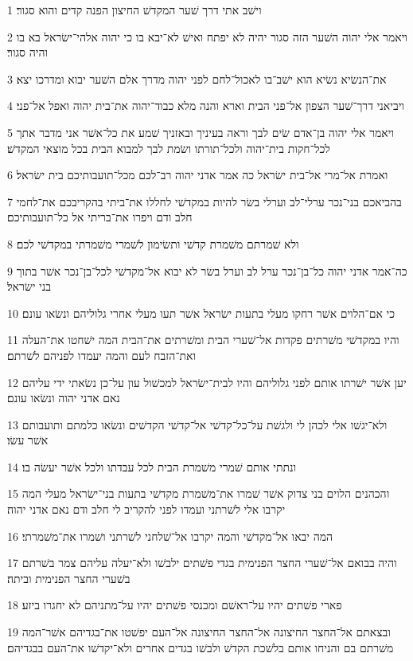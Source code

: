 \par 1 וישׁב אתי דרך שׁער המקדשׁ החיצון הפנה קדים והוא סגור׃
\par 2 ויאמר אלי יהוה השׁער הזה סגור יהיה לא יפתח ואישׁ לא־יבא בו כי יהוה אלהי־ישׂראל בא בו והיה סגור׃
\par 3 את־הנשׂיא נשׂיא הוא ישׁב־בו לאכול־לחם לפני יהוה מדרך אלם השׁער יבוא ומדרכו יצא׃
\par 4 ויביאני דרך־שׁער הצפון אל־פני הבית וארא והנה מלא כבוד־יהוה את־בית יהוה ואפל אל־פני׃
\par 5 ויאמר אלי יהוה בן־אדם שׂים לבך וראה בעיניך ובאזניך שׁמע את כל־אשׁר אני מדבר אתך לכל־חקות בית־יהוה ולכל־תורתו ושׂמת לבך למבוא הבית בכל מוצאי המקדשׁ׃
\par 6 ואמרת אל־מרי אל־בית ישׂראל כה אמר אדני יהוה רב־לכם מכל־תועבותיכם בית ישׂראל׃
\par 7 בהביאכם בני־נכר ערלי־לב וערלי בשׂר להיות במקדשׁי לחללו את־ביתי בהקריבכם את־לחמי חלב ודם ויפרו את־בריתי אל כל־תועבותיכם׃
\par 8 ולא שׁמרתם משׁמרת קדשׁי ותשׂימון לשׁמרי משׁמרתי במקדשׁי לכם׃
\par 9 כה־אמר אדני יהוה כל־בן־נכר ערל לב וערל בשׂר לא יבוא אל־מקדשׁי לכל־בן־נכר אשׁר בתוך בני ישׂראל׃
\par 10 כי אם־הלוים אשׁר רחקו מעלי בתעות ישׂראל אשׁר תעו מעלי אחרי גלוליהם ונשׂאו עונם׃
\par 11 והיו במקדשׁי משׁרתים פקדות אל־שׁערי הבית ומשׁרתים את־הבית המה ישׁחטו את־העלה ואת־הזבח לעם והמה יעמדו לפניהם לשׁרתם׃
\par 12 יען אשׁר ישׁרתו אותם לפני גלוליהם והיו לבית־ישׂראל למכשׁול עון על־כן נשׂאתי ידי עליהם נאם אדני יהוה ונשׂאו עונם׃
\par 13 ולא־יגשׁו אלי לכהן לי ולגשׁת על־כל־קדשׁי אל־קדשׁי הקדשׁים ונשׂאו כלמתם ותועבותם אשׁר עשׂו׃
\par 14 ונתתי אותם שׁמרי משׁמרת הבית לכל עבדתו ולכל אשׁר יעשׂה בו׃
\par 15 והכהנים הלוים בני צדוק אשׁר שׁמרו את־משׁמרת מקדשׁי בתעות בני־ישׂראל מעלי המה יקרבו אלי לשׁרתני ועמדו לפני להקריב לי חלב ודם נאם אדני יהוה׃
\par 16 המה יבאו אל־מקדשׁי והמה יקרבו אל־שׁלחני לשׁרתני ושׁמרו את־משׁמרתי׃
\par 17 והיה בבואם אל־שׁערי החצר הפנימית בגדי פשׁתים ילבשׁו ולא־יעלה עליהם צמר בשׁרתם בשׁערי החצר הפנימית וביתה׃
\par 18 פארי פשׁתים יהיו על־ראשׁם ומכנסי פשׁתים יהיו על־מתניהם לא יחגרו ביזע׃
\par 19 ובצאתם אל־החצר החיצונה אל־החצר החיצונה אל־העם יפשׁטו את־בגדיהם אשׁר־המה משׁרתם בם והניחו אותם בלשׁכת הקדשׁ ולבשׁו בגדים אחרים ולא־יקדשׁו את־העם בבגדיהם׃
